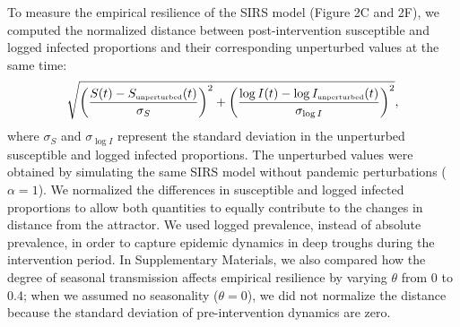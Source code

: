 \documentclass[12pt]{article}
\newcommand{\tsub}[2]{#1_{{\textrm{\tiny #2}}}}
\begin{document}
To measure the empirical resilience of the SIRS model (Figure 2C and 2F), we computed the normalized distance between post-intervention susceptible and logged infected proportions and their corresponding unperturbed values at the same time:
\begin{equation}
\sqrt{\left(\frac{S(t) - \tsub{S}{unperturbed}(t)}{\sigma_S}\right)^2 + \left(\frac{\log I(t) - \log \tsub{I}{unperturbed}(t)}{\sigma_{\log I}}\right)^2},
\end{equation}
where $\sigma_S$ and $\sigma_{\log I}$ represent the standard deviation in the unperturbed susceptible and logged infected proportions.
The unperturbed values were obtained by simulating the same SIRS model without pandemic perturbations ($\alpha = 1$).
We normalized the differences in susceptible and logged infected proportions to allow both quantities to equally contribute to the changes in distance from the attractor.
We used logged prevalence, instead of absolute prevalence, in order to capture epidemic dynamics in deep troughs during the intervention period.
In Supplementary Materials, we also compared how the degree of seasonal transmission affects empirical resilience by varying $\theta$ from 0 to 0.4; when we assumed no seasonality ($\theta = 0$), we did not normalize the distance because the standard deviation of pre-intervention dynamics are zero. 
\end{document}
